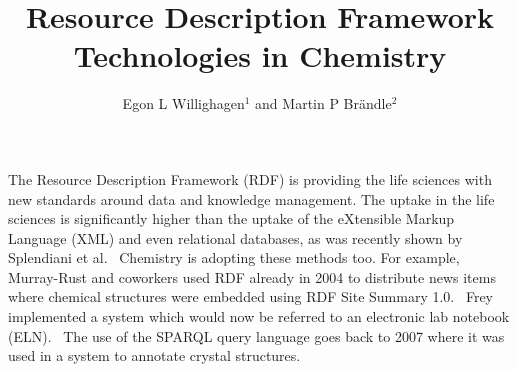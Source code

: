 \documentclass[10pt]{bmc_article}
\newenvironment{bmcformat}{\begin{raggedright}\baselineskip20pt\sloppy\setboolean{publ}{false}}{\end{raggedright}\baselineskip20pt\sloppy}
\begin{document}
\begin{bmcformat}

\title{Resource Description Framework Technologies in Chemistry}
 
\author{Egon L Willighagen\correspondingauthor$^{1}$%
       and 
         Martin P Br\"andle$^2$%
      }

\address{%
    \iid(1)Division of Molecular Toxicology, Institute of Environmental Medicine, Karolinska Institutet, SE-17177 Stockholm, Sweden\\
    \iid(2)Chemistry Biology Pharmacy Information Center, ETH Z\"urich, Wolfgang-Pauli-Str. 10, 8093 Z\"urich, Switzerland
}%

\maketitle




The Resource Description Framework (RDF) is providing the life sciences with new standards
around data and knowledge management. The uptake in the life sciences is
significantly higher than the uptake of the eXtensible Markup Language (XML)
and even relational databases, as was recently shown by Splendiani et
al.~\cite{Splendiani2011} Chemistry is adopting these methods too.
For example, Murray-Rust and coworkers used RDF already in 2004 to distribute
news items where chemical structures were embedded using RDF Site Summary 1.0.~\cite{MurrayRust2004}
Frey implemented a system which would now be referred to an
electronic lab notebook (ELN).~\cite{Frey2004} The use of the SPARQL
query language goes back to 2007 where it was used in a system to annotate
crystal structures.~\cite{Hunter2007}


\end{bmcformat}
\end{document}

